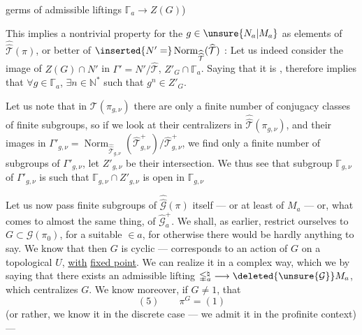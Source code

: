 
germs of admissible liftings $\mathbb{\Gamma}_a\to Z(G)$)

This implies a nontrivial property for
the $g\in\unsure{N_a|M_a}$  as elements of $\widehat{\widehat{\mathcal T}}(\pi)$,
or better of $\inserted{N'=}\operatorname{Norm}_{\widehat{\widehat{\mathcal T}}}(\widehat{\mathcal T})$ :
Let us indeed consider the image  of
$Z(G)\cap N'$ in $\Gamma'=N'/\widehat{\mathcal T}$, 
$Z'_G\cap\mathbb{\Gamma}_a$. Saying that it is  ,
therefore implies that $\forall g\in\mathbb{\Gamma}_a$,  $\exists n\in\mathbb N^{*}$
such that $g^n\in Z'_G$. 

Let us note that in $\mathcal T(\pi_{g,\nu})$ there are
only a finite number of conjugacy classes
of finite subgroups, so if we
look at their centralizers  in
$\widehat{\widehat{\mathcal T}}(\pi_{g,\nu})$, and their images in
$\Gamma'_{g,\nu}=\operatorname{Norm}_{\widehat{\widehat{\mathcal T}}_{g,\nu}}(\widehat{\mathcal T}^{+}_{g,\nu})/\widehat{\mathcal T}^{+}_{g,\nu}$, we
find only a finite number of subgroups
of $\Gamma'_{g,\nu}$, let $Z'_{g,\nu}$ be their intersection.
We thus see that  subgroup $\mathbb{\Gamma}_{g,\nu}$
of $\Gamma'_{g,\nu}$ is such that $\mathbb{\Gamma}_{g,\nu}\cap Z'_{g,\nu}$ is
open in $\mathbb{\Gamma}_{g,\nu}$


Let us now pass  finite
subgroups of $\widehat{\widehat{\mathcal G}}(\pi)$ itself --- or at least
of $M_a$ --- or, what comes to almost the
same thing, of $\widehat{\mathcal G}^{+}_a$. We shall, as
earlier, restrict ourselves to $G\subset\mathcal G(\pi_0)$,
for a suitable  $\in a$,
for otherwise there would be hardly anything to
say. We know that then $G$ is
cyclic ---  corresponds to an action
of $G$ on a topological $U$, \uline{with}
\uline{fixed point}. We can realize it in
a complex way, which we  by
saying that there exists an admissible
lifting $\mathbb{\Gamma}_a^{\natural}\longrightarrow\deleted{\unsure{\mathcal G}} M_a$, which
centralizes $G$. We know moreover, if
$G\ne1$, that \deleted{$\unsure{\pi}$}
\[
(5)\qquad \pi^G=(1)
\]
(or rather, we know it in the discrete case ---
we admit it in the profinite context) ---

